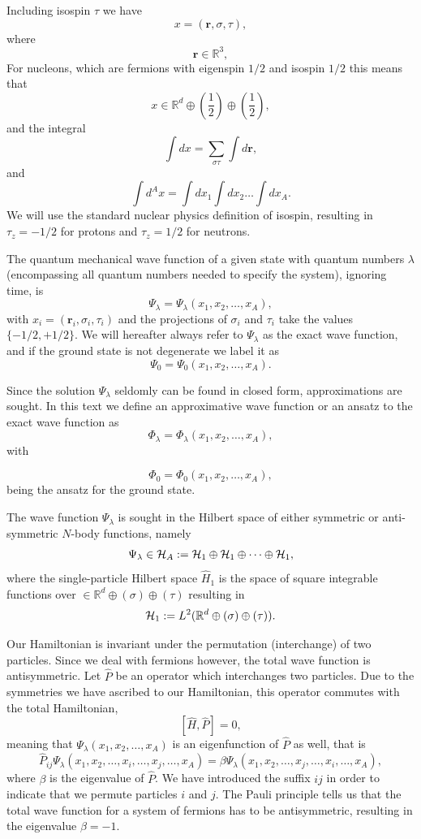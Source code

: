 \documentclass[%
twoside,                 %
final,                   %
10pt]{article}
\begin{document}
Including isospin $\tau$ we have 
\[
x=(\bm{r},\sigma,\tau), 
\]
where 
\[
\bm{r}\in {\mathbb{R}}^{3},
\]
For nucleons, which are fermions with eigenspin $1/2$ and isospin $1/2$ this means that
\[
 x\in {\mathbb{R}}^{d}\oplus (\frac{1}{2})\oplus (\frac{1}{2}),
\]
and the integral
\[
\int dx = \sum_{\sigma\tau}\int d\bm{r},
\]
and
\[
\int d^Ax= \int dx_1\int dx_2\dots\int dx_A.
\]
We will use the standard nuclear physics definition of isospin, resulting in $\tau_z=-1/2$ for protons and $\tau_z=1/2$ for neutrons.



The quantum mechanical wave function of a given state with quantum numbers $\lambda$ (encompassing all quantum numbers needed to specify the system), ignoring time, is
\[
\Psi_{\lambda}=\Psi_{\lambda}(x_1,x_2,\dots,x_A),
\]
with $x_i=(\bm{r}_i,\sigma_i,\tau_i)$ and the projections of $\sigma_i$ and $\tau_i$ take the values
$\{-1/2,+1/2\}$. 
We will hereafter always refer to $\Psi_{\lambda}$ as the exact wave function, and if the ground state is not degenerate we label it as 
\[
\Psi_0=\Psi_0(x_1,x_2,\dots,x_A).
\]


Since the solution $\Psi_{\lambda}$ seldomly can be found in closed form, approximations are sought. In this text we define an approximative wave function or an ansatz to the exact wave function as 
\[
\Phi_{\lambda}=\Phi_{\lambda}(x_1,x_2,\dots,x_A),
\]
with

\[
\Phi_{0}=\Phi_{0}(x_{1},x_{2},\dots,x_{A}),
\]
being the ansatz for the ground state.  


The wave function $\Psi_{\lambda}$ is sought in the Hilbert space of either symmetric or anti-symmetric $N$-body functions, namely
\[
\Psi_{\lambda}\in {\cal H}_A:= {\cal H}_1\oplus{\cal H}_1\oplus\dots\oplus{\cal H}_1,
\]
where the single-particle Hilbert space $\hat{H}_1$ is the space of square integrable functions over $\in {\mathbb{R}}^{d}\oplus (\sigma)\oplus (\tau)$ resulting in
\[
{\cal H}_1:= L^2(\mathbb{R}^{d}\oplus (\sigma)\oplus (\tau)).
\]


Our Hamiltonian is invariant under the permutation (interchange) of two particles.
Since we deal with fermions however, the total wave function is antisymmetric.
Let $\hat{P}$ be an operator which interchanges two particles.
Due to the symmetries we have ascribed to our Hamiltonian, this operator commutes with the total Hamiltonian,
\[
[\hat{H},\hat{P}] = 0,
\]
meaning that $\Psi_{\lambda}(x_1, x_2, \dots , x_A)$ is an eigenfunction of 
$\hat{P}$ as well, that is
\[
\hat{P}_{ij}\Psi_{\lambda}(x_1, x_2, \dots,x_i,\dots,x_j,\dots,x_A)=
\beta\Psi_{\lambda}(x_1, x_2, \dots,x_j,\dots,x_i,\dots,x_A),
\]
where $\beta$ is the eigenvalue of $\hat{P}$. We have introduced the suffix $ij$ in order to indicate that we permute particles $i$ and $j$.
The Pauli principle tells us that the total wave function for a system of fermions
has to be antisymmetric, resulting in the eigenvalue $\beta = -1$.   
\end{document}
